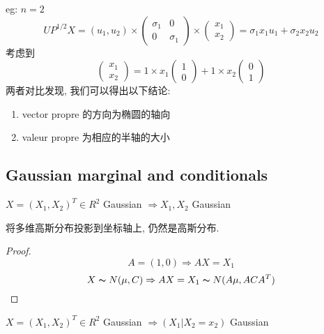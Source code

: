 \documentclass{article}
\begin{document}
eg: $n = 2$\\
$$
U P^{1/2} X
=
(u_1, u_2)
\times
\begin{pmatrix}
\sigma_1 & 0 \\
0 & \sigma_1
\end{pmatrix}
\times
\begin{pmatrix}
x_1\\
x_2
\end{pmatrix}
=
\sigma_1 x_1 u_1 + \sigma_2 x_2 u_2
$$
考虑到
$$
\begin{pmatrix}
x_1\\
x_2
\end{pmatrix}
=
1 \times x_1
\begin{pmatrix}
1\\
0
\end{pmatrix}
+
1 \times x_2
\begin{pmatrix}
0\\
1
\end{pmatrix}
$$
两者对比发现, 我们可以得出以下结论:
\begin{enumerate}
\item vector propre 的方向为椭圆的轴向
\item valeur propre 为相应的半轴的大小
\end{enumerate}

\subsection{Gaussian marginal and conditionals}
\begin{theorem}
$X = (X_1, X_2)^T \in R^2$ Gaussian $\Rightarrow X_1, X_2$ Gaussian
\end{theorem}
将多维高斯分布投影到坐标轴上, 仍然是高斯分布.
\begin{proof}
$$A = (1, 0) \Rightarrow AX = X_1$$
$$X \thicksim{N}(\mu, C) \Rightarrow AX = X_1 \thicksim{N}(A\mu, ACA^T)$$
\end{proof}

\begin{theorem}
$X = (X_1, X_2)^T \in R^2$ Gaussian $\Rightarrow (X_1 | X_2 = x_2)$ Gaussian
\end{theorem}
\end{document}

